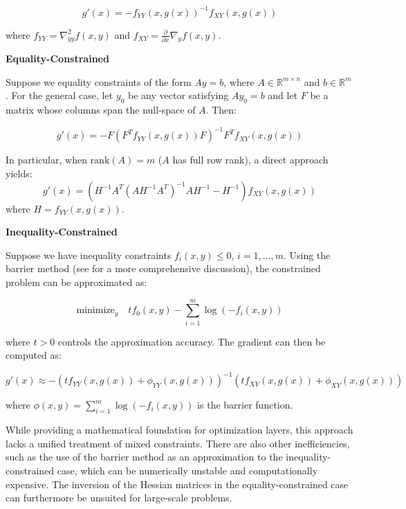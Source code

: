 \documentclass{article}
\begin{document}
\begin{equation}
g'(x) = -f_{YY}(x,g(x))^{-1}f_{XY}(x,g(x))
\end{equation}

where $f_{YY} = \nabla^2_{yy}f(x,y)$ and $f_{XY} = \frac{\partial}{\partial x}\nabla_y f(x,y)$.

\textbf{Equality-Constrained}

Suppose we equality constraints of the form $Ay = b$, where $A \in \mathbb{R}^{m \times n}$ and $b \in \mathbb{R}^m$. For the general case, let $y_0$ be any vector satisfying $Ay_0 = b$ and let $F$ be a matrix whose columns span the null-space of $A$. Then:

\begin{equation}
g'(x) = -F(F^T f_{YY}(x,g(x))F)^{-1}F^T f_{XY}(x,g(x))
\end{equation}

In particular, when $\text{rank}(A) = m$ ($A$ has full row rank), a direct approach yields:
\begin{equation}
g'(x) = (H^{-1}A^T(AH^{-1}A^T)^{-1}AH^{-1} - H^{-1})f_{XY}(x,g(x))
\end{equation}
where $H = f_{YY}(x,g(x))$. 

\textbf{Inequality-Constrained}

Suppose we have inequality constraints $f_i(x,y) \leq 0$, $i=1,\ldots,m$. Using the barrier method (see \citet{boyd2004convex} for a more comprehensive discussion), the constrained problem can be approximated as:

\begin{equation}
\text{minimize}_y \quad tf_0(x,y) - \sum_{i=1}^m \log(-f_i(x,y))
\end{equation}

where $t > 0$ controls the approximation accuracy. The gradient can then be computed as:

\begin{equation}
g'(x) \approx -(tf_{YY}(x,g(x)) + \phi_{YY}(x,g(x)))^{-1}(tf_{XY}(x,g(x)) + \phi_{XY}(x,g(x)))
\end{equation}

where $\phi(x,y) = \sum_{i=1}^m \log(-f_i(x,y))$ is the barrier function.

While providing a mathematical foundation for optimization layers, this approach lacks a unified treatment of mixed constraints. There are also other inefficiencies, such as the use of the barrier method as an approximation to the inequality-constrained case, which can be numerically unstable and computationally expensive. The inversion of the Hessian matrices in the equality-constrained case can furthermore be unsuited for large-scale problems. 
\end{document}
